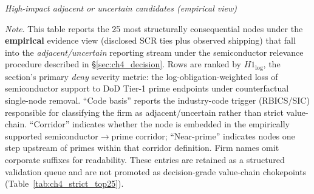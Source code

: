 \begin{table}[tbp]
  \centering
  \caption[\textit{High-impact adjacent or uncertain candidates (empirical view)}]
  {\textit{High-impact adjacent or uncertain candidates (empirical view)}}
  \label{tab:app_c2_adjacent_uncertain_top25}

  \footnotesize
  \setlength{\tabcolsep}{6pt}
  \renewcommand{\arraystretch}{1.04}

  

  \captionsetup{justification=raggedright,singlelinecheck=false}
  \caption*{\footnotesize \textit{Note}. This table reports the 25 most structurally consequential nodes under the \textbf{empirical} evidence view (disclosed SCR ties plus observed shipping) that fall into the \textit{adjacent/uncertain} reporting stream under the semiconductor relevance procedure described in \S\ref{sec:ch4_decision}. Rows are ranked by $H1_{\log}$, the section's primary \textit{deny} severity metric: the log-obligation-weighted loss of semiconductor support to DoD Tier-1 prime endpoints under counterfactual single-node removal. ``Code basis'' reports the industry-code trigger (RBICS/SIC) responsible for classifying the firm as adjacent/uncertain rather than strict value-chain. ``Corridor'' indicates whether the node is embedded in the empirically supported semiconductor$\rightarrow$prime corridor; ``Near-prime'' indicates nodes one step upstream of primes within that corridor definition. Firm names omit corporate suffixes for readability. These entries are retained as a structured validation queue and are not promoted as decision-grade value-chain chokepoints (Table~\ref{tab:ch4_strict_top25}).}
\end{table}